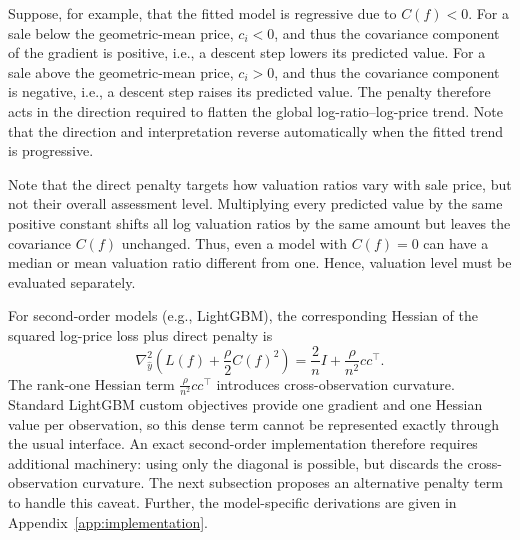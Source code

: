 \documentclass[10pt]{article}
\theoremstyle{definition}
\newcommand{\1}{\mathbf{1}}
\begin{document}
{Suppose, for example, that the fitted model is regressive due to $C(f)<0$. For a sale below the geometric-mean price, $c_i<0$, and thus the covariance component of the gradient is positive, i.e., a descent step lowers its predicted value. For a sale above the geometric-mean price, $c_i>0$, and thus the covariance component is negative, i.e., a descent step raises its predicted value. The penalty therefore acts in the direction required to flatten the global log-ratio--log-price trend. Note that the direction and interpretation reverse automatically when the fitted trend is progressive.}


Note that the direct penalty targets how valuation ratios vary with sale price, but not their overall assessment level. Multiplying every predicted value by the same positive constant shifts all log valuation ratios by the same amount but leaves the covariance $C(f)$ unchanged. Thus, even a model with $C(f)=0$ can have a median or mean valuation ratio different from one. Hence, valuation level must be evaluated separately.



{For second-order models (e.g., LightGBM), the corresponding Hessian of the squared log-price loss plus direct penalty is}
{
\begin{equation}
\label{eq:direct_gradient_hessian}
\nabla_{\widehat y}^2
\left(
L(f)+\frac{\rho}{2}C(f)^2
\right)
=
\frac{2}{n}I+\frac{\rho}{n^2}cc^\top.
\end{equation}
}
The rank-one Hessian term $\frac{\rho}{n^{2}}cc^\top$ introduces cross-observation curvature. Standard LightGBM custom objectives provide one gradient and one Hessian value per observation, so this dense term cannot be represented exactly through the usual interface. An exact second-order implementation therefore requires additional machinery: using only the diagonal is possible, but discards the cross-observation curvature. The next subsection proposes an alternative penalty term to handle this caveat. Further, the model-specific derivations are given in Appendix~\ref{app:implementation}.
\end{document}
